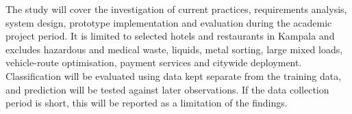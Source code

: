 The study will cover the investigation of current practices, requirements analysis, system design, prototype implementation and evaluation during the academic project period. It is limited to selected hotels and restaurants in Kampala and excludes hazardous and medical waste, liquids, metal sorting, large mixed loads, vehicle-route optimisation, payment services and citywide deployment. Classification will be evaluated using data kept separate from the training data, and prediction will be tested against later observations. If the data collection period is short, this will be reported as a limitation of the findings.
